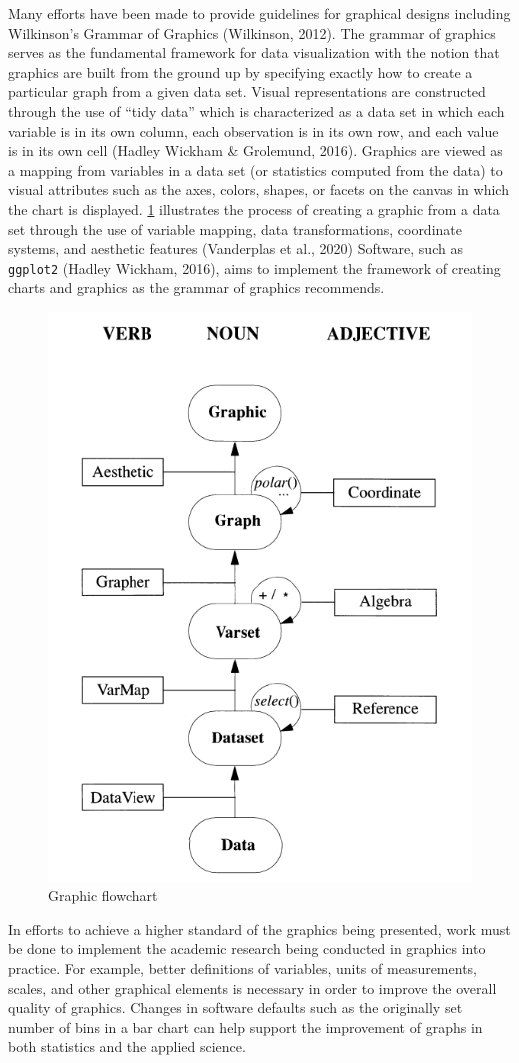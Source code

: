 \documentclass[print]{nuthesis}
\begin{document}
Many efforts have been made to provide guidelines for graphical designs including Wilkinson's Grammar of Graphics (Wilkinson, 2012).
The grammar of graphics serves as the fundamental framework for data visualization with the notion that graphics are built from the ground up by specifying exactly how to create a particular graph from a given data set.
Visual representations are constructed through the use of ``tidy data'' which is characterized as a data set in which each variable is in its own column, each observation is in its own row, and each value is in its own cell (Hadley Wickham \& Grolemund, 2016).
Graphics are viewed as a mapping from variables in a data set (or statistics computed from the data) to visual attributes such as the axes, colors, shapes, or facets on the canvas in which the chart is displayed.
\cref{fig:graphic-flowchart} illustrates the process of creating a graphic from a data set through the use of variable mapping, data transformations, coordinate systems, and aesthetic features (Vanderplas et al., 2020)
Software, such as \texttt{ggplot2} (Hadley Wickham, 2016), aims to implement the framework of creating charts and graphics as the grammar of graphics recommends.

\begin{figure}[tbp]

{\centering \includegraphics[width=0.5\linewidth,]{images/graphic-flowchart} 

}

\caption{Graphic flowchart}\label{fig:graphic-flowchart}
\end{figure}

In efforts to achieve a higher standard of the graphics being presented, work must be done to implement the academic research being conducted in graphics into practice.
For example, better definitions of variables, units of measurements, scales, and other graphical elements is necessary in order to improve the overall quality of graphics.
Changes in software defaults such as the originally set number of bins in a bar chart can help support the improvement of graphs in both statistics and the applied science.
\end{document}
